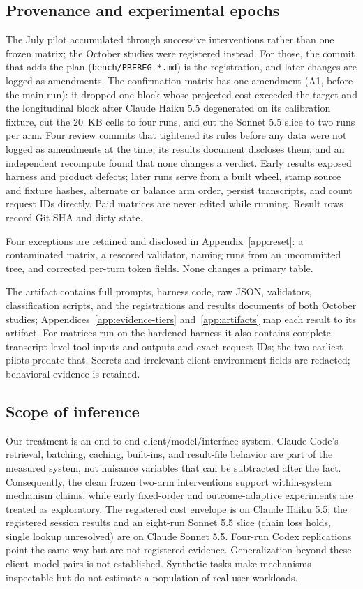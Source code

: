 \documentclass[10pt,twocolumn]{article}
\begin{document}
\subsection{Provenance and experimental epochs}

The July pilot accumulated through successive interventions rather than one
frozen matrix; the October studies were registered instead.  For those, the
commit that adds the plan (\texttt{bench/PREREG-*.md}) is the registration,
and later changes are logged as amendments.  The confirmation matrix has one
amendment (A1, before the main run): it dropped one block whose projected cost
exceeded the target and the longitudinal block after Claude Haiku 5.5
degenerated on its calibration fixture, cut the 20~KB cells to four runs, and
cut the Sonnet 5.5 slice to two runs per arm.  Four review commits that tightened its rules
before any data were not logged as amendments at the time; its results
document discloses them, and an independent recompute found that none changes
a verdict.  Early results exposed harness and product defects; later
runs serve from a built wheel, stamp source and fixture hashes, alternate or
balance arm order, persist transcripts, and count request IDs directly.  Paid
matrices are never edited while running.  Result rows record Git SHA and dirty
state.

Four exceptions are retained and disclosed in Appendix~\ref{app:reset}: a
contaminated matrix, a rescored validator, naming runs from an uncommitted
tree, and corrected per-turn token fields.  None changes a primary table.

The artifact contains full prompts, harness code, raw JSON, validators,
classification scripts, and the registrations and results documents of both
October studies; Appendices~\ref{app:evidence-tiers} and~\ref{app:artifacts}
map each result to its artifact.  For
matrices run on the hardened harness it also contains complete
transcript-level tool inputs and outputs and exact request IDs; the two
earliest pilots predate that.  Secrets and irrelevant client-environment fields are redacted;
behavioral evidence is retained.

\subsection{Scope of inference}

Our treatment is an end-to-end client/model/interface system.  Claude Code's
retrieval, batching, caching, built-ins, and result-file behavior are part of
the measured system, not nuisance variables that can be subtracted after the
fact.  Consequently, the clean frozen two-arm interventions support
within-system mechanism claims, while early fixed-order and outcome-adaptive
experiments are treated as exploratory.  The registered cost envelope is on
Claude Haiku 5.5; the registered session results and an eight-run Sonnet 5.5
slice (chain loss holds, single lookup unresolved) are on Claude Sonnet 5.5.
Four-run Codex replications point the same way but are not registered
evidence.  Generalization beyond these
client--model pairs is not established.  Synthetic tasks make mechanisms
inspectable but do not estimate a population of real user workloads.
\end{document}
